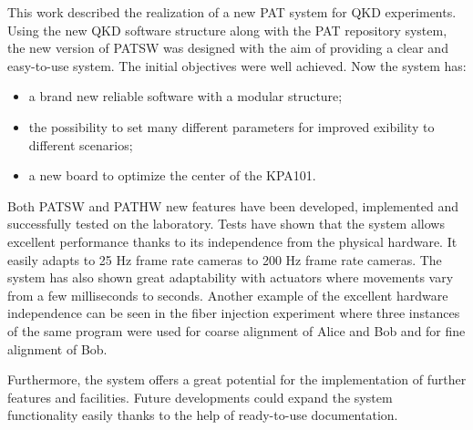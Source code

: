 This work described the realization of a new PAT system for QKD experiments. Using the new QKD software structure along with the PAT repository system, the new version of PATSW was designed with the aim of providing a clear and easy-to-use system. The initial objectives were well achieved. Now the system has:
\begin{itemize}
  \item a brand new reliable software with a modular structure;
  \item the possibility to set many different parameters for improved exibility to different scenarios;
  \item a new board to optimize the center of the KPA101.
\end{itemize}
Both PATSW and PATHW new features have been developed, implemented and
successfully tested on the laboratory. Tests have shown that the system allows excellent performance thanks to its independence from the physical hardware. It easily adapts to 25 Hz frame rate cameras to 200 Hz frame rate cameras. The system has also shown great adaptability with actuators where movements vary from a few milliseconds to seconds. Another example of the excellent hardware independence can be seen in the fiber injection experiment where three instances of the same program were used for coarse alignment of Alice and Bob and for fine alignment of Bob.

Furthermore, the system offers a great potential for the implementation of further
features and facilities. Future developments could expand the system functionality easily thanks to the help of ready-to-use documentation.